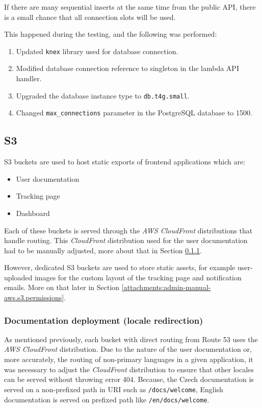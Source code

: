 If there are many sequential inserts at the same time from the public API, there is a small chance that all connection slots will be used.

This happened during the testing, and the following was performed:
\begin{enumerate}
    \item Updated \texttt{knex} library used for database connection.
    \item Modified database connection reference to singleton in the lambda API handler.
    \item Upgraded the database instance type to \texttt{db.t4g.small}.
    \item Changed \texttt{max\_connections} parameter in the PostgreSQL database to 1500.
\end{enumerate}

\subsection{\ac{S3}}
\ac{S3} buckets are used to host static exports of frontend applications which are:
\begin{itemize}
    \item User documentation
    \item Tracking page
    \item Dashboard
\end{itemize}

Each of these buckets is served through the \textit{AWS CloudFront} distributions that handle routing.
This \textit{CloudFront} distribution used for the user documentation had to be manually adjusted, more about that in Section \ref{attachments:admin-manual-aws.s3.docs_redirect}.

However, dedicated \ac{S3} buckets are used to store static assets, for example user-uploaded images for the custom layout of the tracking page and notification emails.
More on that later in Section \ref{attachments:admin-manual-aws.s3.permissions}.

\subsubsection{Documentation deployment (locale redirection)}
\label{attachments:admin-manual-aws.s3.docs_redirect}
As mentioned previously, each bucket with direct routing from Route 53 uses the \textit{AWS CloudFront} distribution.
Due to the nature of the user documentation or, more accurately, the routing of non-primary languages in a given application, it was necessary to adjust the \textit{CloudFront} distribution to ensure that other locales can be served without throwing error 404.
Because, the Czech documentation is served on a non-prefixed path in URI such as \texttt{/docs/welcome}, English documentation is served on prefixed path like \texttt{/en/docs/welcome}. 

